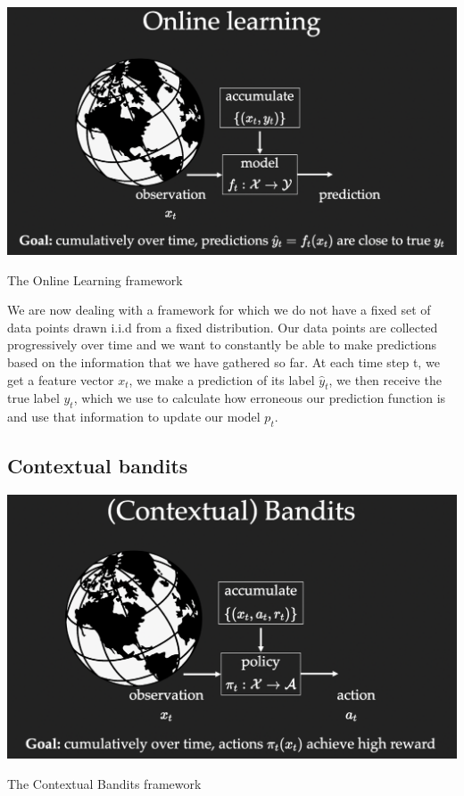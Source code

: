 \begin{marginfigure}%
  \includegraphics[width=\linewidth]{Online_Learning.png}
\caption{The Online Learning framework}
  \label{fig:online_learning_framework}
\end{marginfigure}

We are now dealing with a framework for which we do not have a fixed set of data points drawn i.i.d from a fixed distribution. Our data points are collected progressively over time and we want to constantly be able to make predictions based on the information that we have gathered so far. 
At each time step t, we get a feature vector $x_t$, we make a prediction of its label $\hat{y}_t$, we then receive the true label $y_t$, which we use to calculate how erroneous our prediction function is and use that information to update our model $p_t$.

\subsection*{Contextual bandits}
    
\begin{marginfigure}%
  \includegraphics[width=\linewidth]{Contextual_Bandits.png}
\caption{The Contextual Bandits framework}
  \label{fig:contextual_bandits_framework}
\end{marginfigure}
    

